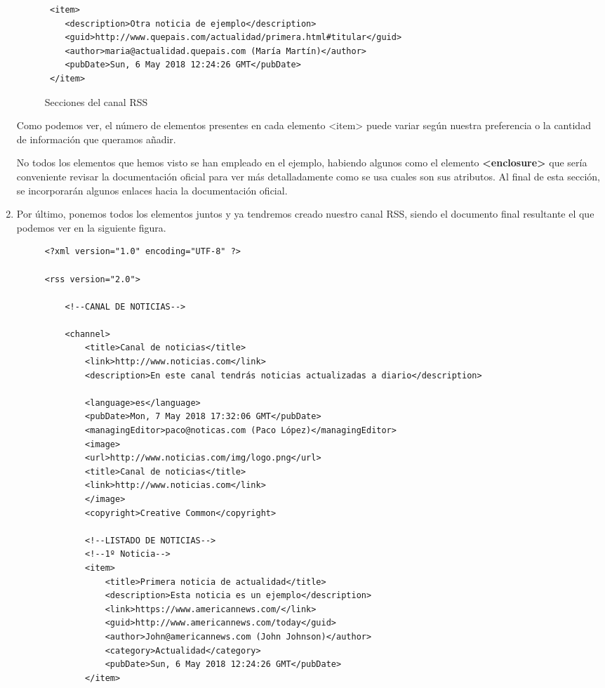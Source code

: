 \begin{enumerate}
\begin{figure}[h]
\begin{tcolorbox}[sharp corners, colback=yellow!30, colframe=white!20]
\begin{verbatim}
 <item>
    <description>Otra noticia de ejemplo</description>
    <guid>http://www.quepais.com/actualidad/primera.html#titular</guid>
    <author>maria@actualidad.quepais.com (María Martín)</author>
    <pubDate>Sun, 6 May 2018 12:24:26 GMT</pubDate>
 </item>
            \end{verbatim}
        \end{tcolorbox}
        \caption{Secciones del canal RSS}
    \end{figure}

    Como podemos ver, el número de elementos presentes en cada elemento <item> puede variar según nuestra preferencia o la cantidad de información que queramos añadir.

    No todos los elementos que hemos visto se han empleado en el ejemplo, habiendo algunos como el elemento \textbf{<enclosure>} que sería conveniente revisar la documentación oficial para ver más detalladamente como se usa cuales son sus atributos. Al final de esta sección, se incorporarán algunos enlaces hacia la documentación oficial.

    \item Por último, ponemos todos los elementos juntos y ya tendremos creado nuestro canal RSS, siendo el documento final resultante el que podemos ver en la siguiente figura.

    \begin{figure}[H]
        \begin{tcolorbox}[sharp corners, colback=yellow!30, colframe=white!20]
            \scriptsize
            \begin{verbatim}
<?xml version="1.0" encoding="UTF-8" ?>

<rss version="2.0">

    <!--CANAL DE NOTICIAS-->

    <channel>
        <title>Canal de noticias</title>
        <link>http://www.noticias.com</link>
        <description>En este canal tendrás noticias actualizadas a diario</description>

        <language>es</language>
        <pubDate>Mon, 7 May 2018 17:32:06 GMT</pubDate>
        <managingEditor>paco@noticas.com (Paco López)</managingEditor>
        <image>
        <url>http://www.noticias.com/img/logo.png</url>
        <title>Canal de noticias</title>
        <link>http://www.noticias.com</link>
        </image>
        <copyright>Creative Common</copyright>

        <!--LISTADO DE NOTICIAS-->
        <!--1º Noticia-->
        <item>
            <title>Primera noticia de actualidad</title>
            <description>Esta noticia es un ejemplo</description>
            <link>https://www.americannews.com/</link>
            <guid>http://www.americannews.com/today</guid>
            <author>John@americannews.com (John Johnson)</author>
            <category>Actualidad</category>
            <pubDate>Sun, 6 May 2018 12:24:26 GMT</pubDate>
        </item>


\end{verbatim}
\end{tcolorbox}
\end{figure}
\end{enumerate}
